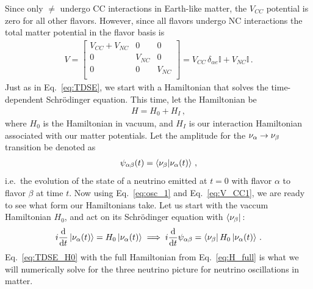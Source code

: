 Since only $\ne$ undergo CC interactions in Earth-like matter, the $V_{CC}$ potential is zero for all other flavors. 
However, since all flavors undergo NC interactions the total matter potential in the flavor basis is
\begin{align}\label{eq:V_matrix}
    V = \begin{bmatrix}
        V_{CC} + V_{NC} & 0 & 0 \\
        0 & V_{NC} & 0 \\
        0 & 0 & V_{NC} \\
    \end{bmatrix} = V_{CC}\, \delta_{\alpha e}\mathbb{I} + V_{NC}\mathbb{I}\,.
\end{align}
Just as in Eq.~\ref{eq:TDSE}, we start with a Hamiltonian that solves the time-dependent Schrödinger equation. This time, let the Hamiltonian be 
\begin{align}\label{eq:H_full}
    H = H_0 + H_{I}\,,
\end{align}
where $H_0$ is the Hamiltonian in vacuum, and $H_{I}$ is our interaction Hamiltonian associated with our matter potentials.
Let the amplitude for the $\nu_\alpha \to \nu_\beta$ transition be denoted as
\begin{align}
    \psi_{\alpha\beta}(t) = \bra{\nu_\beta}\ket{\nu_\alpha (t)}\,,
\end{align}
i.e.~the evolution of the state of a neutrino emitted at $t =0$ with flavor $\alpha$ to flavor $\beta$ at time $t$. Now using Eq.~\ref{eq:osc_1} and Eq.~\ref{eq:V_CC1}, we are ready to see what form our Hamiltonians take.
Let us start with the vaccum Hamiltonian $H_0$, and act on its Schrödinger equation with $\bra{\nu_\beta}\,$:
\begin{align}\label{eq:TDSE_H0}
    i \dv{}{t}\ket{\nu_\alpha (t)} = H_0\ket{\nu_\alpha (t)} \implies i \dv{}{t}\psi_{\alpha\beta} = \bra{\nu_\beta}H_0\ket{\nu_\alpha (t)}\,.
\end{align}
Eq.~\ref{eq:TDSE_H0} with the full Hamiltonian from Eq.~\ref{eq:H_full} is what we will numerically solve for the three neutrino picture
for neutrino oscillations in matter.

